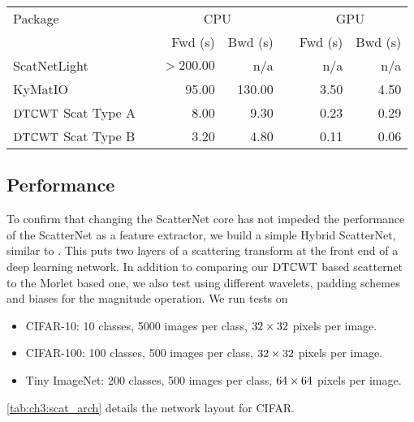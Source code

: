 \begin{table}
  \renewcommand{\arraystretch}{1.2}
  \centering
  \begin{tabular}{@{}lcrrcrr}
    \toprule
    Package &\phantom{ab} & \multicolumn{2}{c}{CPU} && \multicolumn{2}{c}{GPU} \\\cline{3-4}\cline{6-7}
    && Fwd (s) & Bwd (s) && Fwd (s) & Bwd (s) \\\midrule
    ScatNetLight\cite{oyallon_deep_2015}&& $>200.00$ & n/a && n/a & n/a \\
    KyMatIO\cite{andreux_kymatio:_2018}&& 95.00 & 130.00 && 3.50& 4.50 \\
    $\mathrm{DT}\mathbb{C}\mathrm{WT}$ Scat Type A && 8.00 & 9.30 && 0.23 & 0.29 \\
    $\mathrm{DT}\mathbb{C}\mathrm{WT}$ Scat Type B && 3.20 & 4.80 && 0.11 & 0.06 \\\bottomrule
  \end{tabular}\label{tab:ch3:scat_speeds}
\end{table}

\subsection{Performance}
To confirm that changing the ScatterNet core has not impeded the
performance of the ScatterNet as a feature extractor, we build a simple Hybrid
ScatterNet, similar to \cite{oyallon_hybrid_2017, oyallon_scaling_2017}. This
puts two layers of a scattering transform at the front end of a deep learning
network. In addition to comparing our $\mathrm{DT}\mathbb{C}\mathrm{WT}$ based
scatternet to the Morlet based one, we also test using different wavelets,
padding schemes and biases for the magnitude operation. 
We run tests on 
\begin{itemize}
  \item CIFAR-10: 10 classes, 5000 images per class, $32\times 32$ pixels per image.
  \item CIFAR-100: 100 classes, 500 images per class, $32\times 32$ pixels per image. 
  \item Tiny ImageNet\cite{li_tiny_nodate}: 200 classes, 500 images per class, 
    $64 \times 64$ pixels per image. 
\end{itemize}
\autoref{tab:ch3:scat_arch} details the network layout for CIFAR. 

